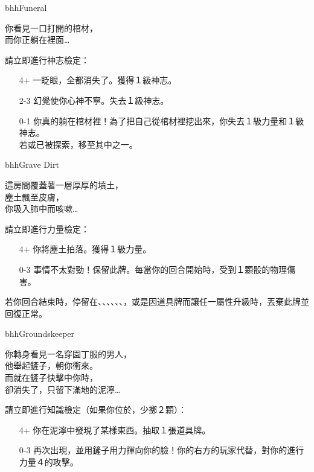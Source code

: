 \begin{EventCard}{bhh}{Funeral}
  \begin{CardStory}
    你看見一口打開的棺材，\\
    而你正躺在裡面…
  \end{CardStory}
  請立即進行神志檢定：
  \begin{itemize}
    \item[4+] 一眨眼，全都消失了。獲得１級神志。
    \item[2-3] 幻覺使你心神不寧。失去１級神志。
    \item[0-1] 你真的躺在棺材裡！為了把自己從棺材裡挖出來，你失去１級力量和１級神志。\\
               若或已被探索，移至其中之一。
  \end{itemize}
\end{EventCard}%
\linebreak[0]%
\begin{EventCard}{bhh}{Grave Dirt}
  \begin{CardStory}
    這房間覆蓋著一層厚厚的墳土，\\
    塵土飄至皮膚，\\
    你吸入肺中而咳嗽…
  \end{CardStory}
  請立即進行力量檢定：
  \begin{itemize}
    \item[4+] 你將塵土拍落。獲得１級力量。
    \item[0-3] 事情不太對勁！保留此牌。每當你的回合開始時，受到１顆骰的物理傷害。
  \end{itemize}
  若你回合結束時，停留在、、、、、、，或是因道具牌而讓任一屬性升級時，丟棄此牌並回復正常。\smallbreak
\end{EventCard}%
\linebreak[0]%
\begin{EventCard}{bhh}{Groundskeeper}
  \begin{CardStory}
    你轉身看見一名穿園丁服的男人，\\
    他舉起鏟子，朝你衝來。\\
    而就在鏟子快擊中你時，\\
    卻消失了，只留下滿地的泥濘…
  \end{CardStory}
  請立即進行知識檢定（如果你位於，少擲２顆）：
  \begin{itemize}
    \item[4+] 你在泥濘中發現了某樣東西。抽取１張道具牌。
    \item[0-3] \ThisName{}再次出現，並用鏟子用力揮向你的臉！你的右方的玩家代替\ThisName{}，對你的進行力量４的攻擊。
  \end{itemize}
\end{EventCard}%
